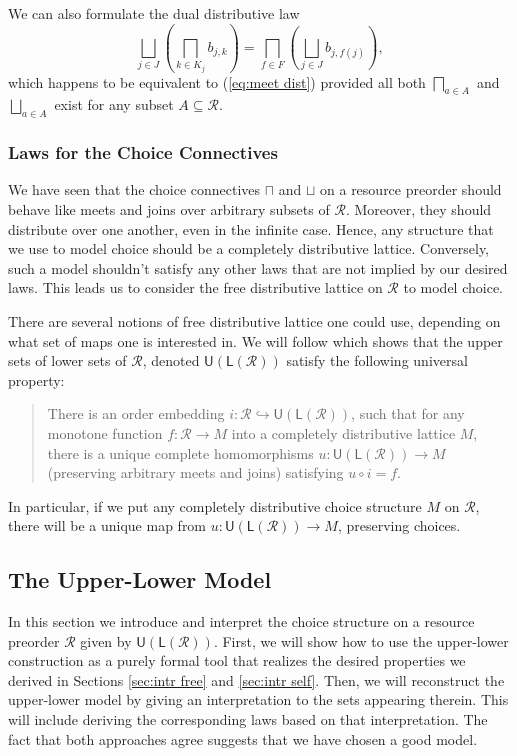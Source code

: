 \documentclass[12pt]{article}
\theoremstyle{definition}
\theoremstyle{plain}
\theoremstyle{plain}
\theoremstyle{plain}
\theoremstyle{plain}
\theoremstyle{remark}
\theoremstyle{remark}
\newcommand{\mc}[1]{\mathcal{#1}}
\newcommand{\sub}{\subseteq}
\newcommand{\low}{\mathsf{L}}
\newcommand{\upper}{\mathsf{U}}
\begin{document}
We can also formulate the dual distributive law
\begin{equation}
\bigsqcup_{j \in J} \left( \bigsqcap_{k \in K_j} b_{j,k} \right) = \bigsqcap_{f \in F} \left( \bigsqcup_{j \in J} b_{j,f(j)} \right),
\end{equation}
which happens to be equivalent to (\ref{eq:meet dist}) provided all both $\bigsqcap_{a \in A}$ and $\bigsqcup_{a \in A}$ exist for any subset $A \sub \mc{R}$.

\subsubsection{Laws for the Choice Connectives}
We have seen that the choice connectives $\sqcap$ and $\sqcup$ on a resource preorder should behave like meets and joins over arbitrary subsets of $\mc{R}$. Moreover, they should distribute over one another, even in the infinite case. Hence, any structure that we use to model choice should be a completely distributive lattice. Conversely, such a model shouldn't satisfy any other laws that are not implied by our desired laws. This leads us to consider the free distributive lattice on $\mc{R}$ to model choice. 

There are several notions of free distributive lattice one could use, depending on what set of maps one is interested in. We will follow \cite{Morris2004} which shows that the upper sets of lower sets of $\mc{R}$, denoted $\upper(\low(\mc{R}))$ satisfy the following universal property:
\begin{quote}
	There is an order embedding $i: \mc{R} \hookrightarrow \upper(\low(\mc{R}))$, such that for any monotone function $f: \mc{R} \rightarrow M$ into a completely distributive lattice $M$, there is a unique complete homomorphisms $u: \upper(\low(\mc{R})) \rightarrow M$ (preserving arbitrary meets and joins) satisfying $u \circ i = f$.
\end{quote}

In particular, if we put any completely distributive choice structure $M$ on $\mc{R}$, there will be a unique map from $u: \upper(\low(\mc{R})) \rightarrow M$, preserving choices. 

\subsection{The Upper-Lower Model}
In this section we introduce and interpret the choice structure on a resource preorder $\mc{R}$ given by $\upper(\low(\mc{R}))$. First, we will show how to use the upper-lower construction as a purely formal tool that realizes the desired properties we derived in Sections \ref{sec:intr free} and \ref{sec:intr self}. Then, we will reconstruct the upper-lower model by giving an interpretation to the sets appearing therein. This will include deriving the corresponding laws based on that interpretation. The fact that both approaches agree suggests that we have chosen a good model.
\end{document}
